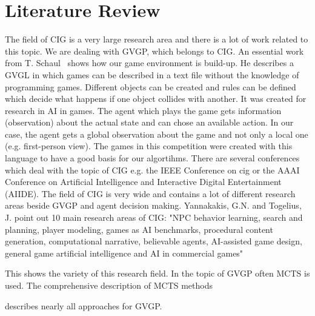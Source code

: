 \section{Literature Review} \label{sec:lit}

The field of \ac{CIG} is a very large research area and there is a lot of work related to this topic. We are dealing with \ac{GVGP}, which belongs to \ac{CIG}. 
An essential work from T. Schaul~\cite{schaul2013pyvgdl} shows how our game environment is build-up. He describes a \ac{GVGL} in which games can be described in a text file without the knowledge of programming games. Different objects can be created and rules can be defined which decide what happens if one object collides with another. It was created for research in \ac{AI} in games. The agent which plays the game gets information (observation) about the actual state and can chose an available action. In our case, the agent gets a global observation about the game and not only a local one (e.g. first-person view). The games in this competition were created with this language to have a good basis for our algortihms.
There are several conferences which deal with the topic of \ac{CIG} e.g. the IEEE Conference on \ac{cig} or the AAAI Conference on Artificial Intelligence and Interactive Digital Entertainment (AIIDE). The field of \ac{CIG} is very wide and contains a lot of different research areas beside \ac{GVGP} and agent decision making. Yannakakis, G.N. and Togelius, J. point out 10 main research areas of \ac{CIG}: "NPC behavior learning, search and planning, player modeling, games as AI benchmarks, procedural content generation, computational narrative, believable agents, AI-assisted game design, general game artificial intelligence and AI in commercial games"


This shows the variety of this research field. In the topic of \ac{GVGP} often \ac{MCTS} is used. The comprehensive description of \ac{MCTS} methods 


describes nearly all approaches for \ac{GVGP}. 
